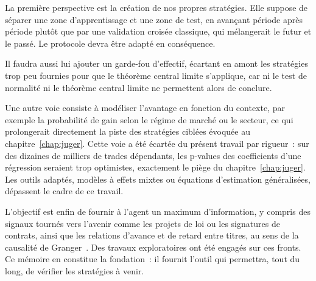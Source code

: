 La première perspective est la création de nos propres stratégies. Elle
suppose de séparer une zone d'apprentissage et une zone de test, en avançant
période après période plutôt que par une validation croisée classique, qui
mélangerait le futur et le passé. Le protocole devra être adapté en
conséquence.

Il faudra aussi lui ajouter un garde-fou d'effectif, écartant en amont les
stratégies trop peu fournies pour que le théorème central limite s'applique,
car ni le test de normalité ni le théorème central limite ne permettent alors
de conclure.

Une autre voie consiste à modéliser l'avantage en fonction du contexte, par
exemple la probabilité de gain selon le régime de marché ou le secteur, ce qui
prolongerait directement la piste des stratégies ciblées évoquée au
chapitre~\ref{chap:juger}. Cette voie a été écartée du présent travail par
rigueur~: sur des dizaines de milliers de trades dépendants, les p-values des
coefficients d'une régression seraient trop optimistes, exactement le piège du
chapitre~\ref{chap:juger}. Les outils adaptés, modèles à effets mixtes ou
équations d'estimation généralisées, dépassent le cadre de ce travail.

L'objectif est enfin de fournir à l'agent un maximum d'information, y compris
des signaux tournés vers l'avenir comme les projets de loi ou les signatures de
contrats, ainsi que les relations d'avance et de retard entre titres, au sens
de la causalité de Granger~\cite{granger1969}. Des travaux exploratoires ont
été engagés sur ces fronts. Ce mémoire en constitue la fondation~: il fournit
l'outil qui permettra, tout du long, de vérifier les stratégies à venir.